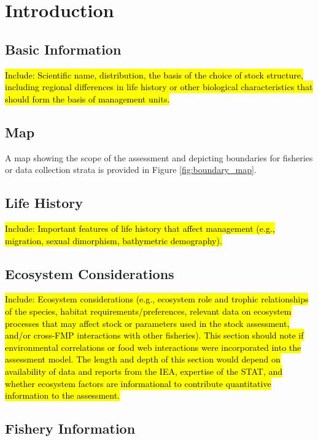 \documentclass[12pt,]{article}
\begin{document}
\section{Introduction}\label{introduction}

\subsection{Basic Information}\label{basic-information}

\hl{Include: Scientific name, distribution, the basis of the choice of stock structure, 
including regional differences in life history or other biological characteristics 
that should form the basis of management units.}

\subsection{Map}\label{map}

A map showing the scope of the assessment and depicting boundaries for
fisheries or data collection strata is provided in Figure
\ref{fig:boundary_map}.

\subsection{Life History}\label{life-history}

\hl{Include: Important features of life history that affect management (e.g., migration, 
sexual dimorphism, bathymetric demography).}

\subsection{Ecosystem Considerations}\label{ecosystem-considerations-1}

\hl{Include: Ecosystem considerations (e.g., ecosystem role and trophic relationships of 
the species, habitat requirements/preferences, relevant data on ecosystem processes 
that may affect stock or parameters used in the stock assessment, and/or cross-FMP 
interactions with other fisheries). This section should note if environmental 
correlations or food web interactions were incorporated into the assessment model. 
The length and depth of this section would depend on availability of data and reports 
from the IEA, expertise of the STAT, and whether ecosystem factors are informational 
to contribute quantitative information to the assessment.}

\subsection{Fishery Information}\label{fishery-information}
\end{document}
